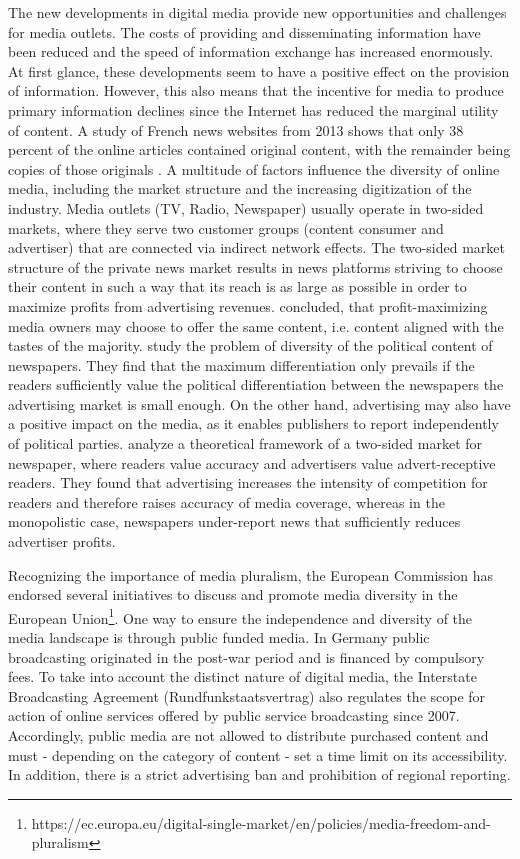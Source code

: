 \documentclass[12pt,a4paper,notitlepage]{article}
\begin{document}
The new developments in digital media provide new opportunities and challenges for media outlets. The costs of providing and disseminating information have been reduced and the speed of information exchange has increased enormously. At first glance, these developments seem to have a positive effect on the provision of information. However, this also means that the incentive for media to produce primary information declines since the Internet has reduced the marginal utility of content. A study of French news websites from 2013 shows that only 38 percent of the online articles contained original content, with the remainder being copies of those originals \citep{cage_information_2017}. A multitude of factors influence the diversity of online media, including the market structure and the increasing digitization of the industry. Media outlets (TV, Radio, Newspaper) usually operate in two-sided markets, where they serve two customer groups (content consumer and advertiser) that are connected via indirect network effects. The two-sided market structure of the private news market results in news platforms striving to choose their content in such a way that its reach is as large as possible in order to maximize profits from advertising revenues. \citet{steiner_program_1952} concluded, that profit-maximizing media owners may choose to offer the same content, i.e. content aligned with the tastes of the majority. \citet{gabszewicz_press_2001} study the problem of diversity of the political content of newspapers. They find that the maximum differentiation only prevails if the readers sufficiently value the political differentiation between the newspapers the advertising market is small enough. On the other hand, advertising may also have a positive impact on the media, as it enables publishers to report independently of political parties. \citet{ellman_what_2009} analyze a theoretical framework of a two-sided market for newspaper, where readers value accuracy and advertisers value advert-receptive readers. They found that advertising increases the intensity of competition for readers and therefore raises accuracy of media coverage, whereas in the monopolistic case, newspapers under-report news that sufficiently reduces advertiser profits. 

Recognizing the importance of media pluralism, the European Commission has endorsed several initiatives to discuss and promote media diversity in the European Union\footnote{https://ec.europa.eu/digital-single-market/en/policies/media-freedom-and-pluralism}. One way to ensure the independence and diversity of the media landscape is through public funded media. In Germany public broadcasting originated in the post-war period and is financed by compulsory fees. To take into account the distinct nature of digital media, the Interstate Broadcasting Agreement (Rundfunkstaatsvertrag) also regulates the scope for action of online services offered by public service broadcasting since 2007. Accordingly, public media are not allowed to distribute purchased content and must - depending on the category of content - set a time limit on its accessibility. In addition, there is a strict advertising ban and prohibition of regional reporting. 
\end{document}
